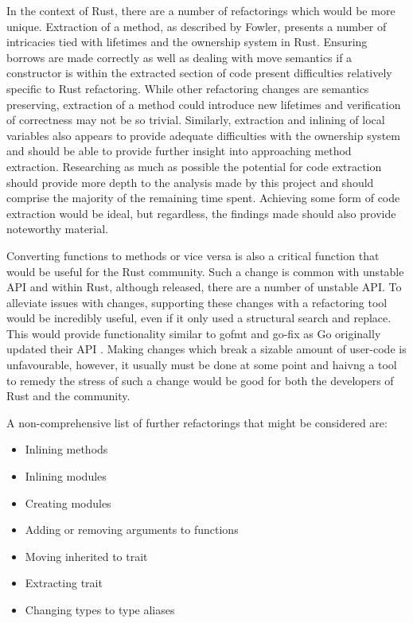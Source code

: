 In the context of Rust, there are a number of refactorings which would be more unique. Extraction of a method, as described by Fowler, presents a number of intricacies tied with lifetimes and the ownership system in Rust. Ensuring borrows are made correctly as well as dealing with move semantics if a constructor is within the extracted section of code present difficulties relatively specific to Rust refactoring. While other refactoring changes are semantics preserving, extraction of a method could introduce new lifetimes and verification of correctness may not be so trivial. Similarly, extraction and inlining of local variables also appears to provide adequate difficulties with the ownership system and should be able to provide further insight into approaching method extraction. Researching as much as possible the potential for code extraction should provide more depth to the analysis made by this project and should comprise the majority of the remaining time spent. Achieving some form of code extraction would be ideal, but regardless, the findings made should also provide noteworthy material.

Converting functions to methods or vice versa is also a critical function that would be useful for the Rust community. Such a change is common with unstable API and within Rust, although released, there are a number of unstable API. To alleviate issues with changes, supporting these changes with a refactoring tool would be incredibly useful, even if it only used a structural search and replace. This would provide functionality similar to gofmt and go-fix as Go originally updated their API \cite{gofix11}. Making changes which break a sizable amount of user-code is unfavourable, however, it usually must be done at some point and haivng a tool to remedy the stress of such a change would be good for both the developers of Rust and the community.

\noindent
A non-comprehensive list of further refactorings that might be considered are:
\begin{itemize}
\item Inlining methods
\item Inlining modules
\item Creating modules
\item Adding or removing arguments to functions
\item Moving inherited to trait
\item Extracting trait
\item Changing types to type aliases
\end{itemize}

